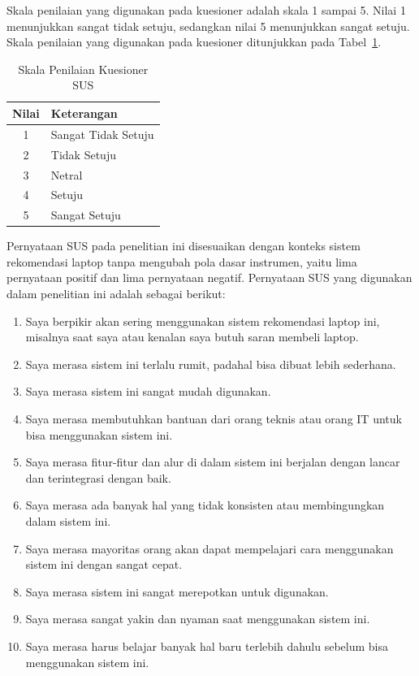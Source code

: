 Skala penilaian yang digunakan pada kuesioner adalah skala 1 sampai 5. Nilai 1 menunjukkan sangat tidak setuju, sedangkan nilai 5 menunjukkan sangat setuju. Skala penilaian yang digunakan pada kuesioner ditunjukkan pada Tabel~\ref{tab:skala_sus}.

\begin{table}[htbp]
\centering
\caption{Skala Penilaian Kuesioner SUS}
\label{tab:skala_sus}
\begin{tabular}{|c|l|}
\hline
\textbf{Nilai} & \textbf{Keterangan} \\ \hline
1 & Sangat Tidak Setuju \\ \hline
2 & Tidak Setuju \\ \hline
3 & Netral \\ \hline
4 & Setuju \\ \hline
5 & Sangat Setuju \\ \hline
\end{tabular}
\end{table}

Pernyataan SUS pada penelitian ini disesuaikan dengan konteks sistem rekomendasi laptop tanpa mengubah pola dasar instrumen, yaitu lima pernyataan positif dan lima pernyataan negatif. Pernyataan SUS yang digunakan dalam penelitian ini adalah sebagai berikut:
\begin{enumerate}
    \item Saya berpikir akan sering menggunakan sistem rekomendasi laptop ini, misalnya saat saya atau kenalan saya butuh saran membeli laptop.
    \item Saya merasa sistem ini terlalu rumit, padahal bisa dibuat lebih sederhana.
    \item Saya merasa sistem ini sangat mudah digunakan.
    \item Saya merasa membutuhkan bantuan dari orang teknis atau orang IT untuk bisa menggunakan sistem ini.
    \item Saya merasa fitur-fitur dan alur di dalam sistem ini berjalan dengan lancar dan terintegrasi dengan baik.
    \item Saya merasa ada banyak hal yang tidak konsisten atau membingungkan dalam sistem ini.
    \item Saya merasa mayoritas orang akan dapat mempelajari cara menggunakan sistem ini dengan sangat cepat.
    \item Saya merasa sistem ini sangat merepotkan untuk digunakan.
    \item Saya merasa sangat yakin dan nyaman saat menggunakan sistem ini.
    \item Saya merasa harus belajar banyak hal baru terlebih dahulu sebelum bisa menggunakan sistem ini.
\end{enumerate}

